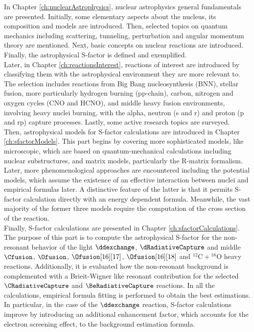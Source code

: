 \documentclass[openany]{book}
\begin{document}
In Chapter \ref{ch:nuclearAstrophysics}, nuclear astrophysics general fundamentals are presented. Initially, some elementary aspects about the nucleus, its composition and models are introduced. Then, selected topics on quantum mechanics including scattering, tunneling, perturbation and angular momentum theory are mentioned. Next, basic concepts on nuclear reactions are introduced. Finally, the astrophysical S-factor is defined and exemplified. \\

Later, in Chapter \ref{ch:reactionsInterest}, reactions of interest are introduced by classifying them with the astrophysical environment they are more relevant to. The selection includes reactions from Big Bang nucleosynthesis (BNN), stellar fusion, more particularly hydrogen burning (pp-chain), carbon, nitrogen and oxygen cycles (CNO and HCNO), and middle heavy fusion environments, involving heavy nuclei burning, with the alpha, neutron (s and r) and proton (p and rp) capture processes. Lastly, some active research topics are surveyed. \\

Then, astrophysical models for S-factor calculations are introduced in Chapter \ref{ch:sfactorModels}. This part begins by covering more sophisticated models, like microscopic, which are based on quantum-mechanical calculations including nuclear substructures, and matrix models, particularly the R-matrix formalism. Later, more phenomenological approaches are encountered including the potential models, which assume the existence of an effective interaction between nuclei and empirical formulas later. A distinctive feature of the latter is that it permits S-factor calculation directly with an energy dependent formula. Meanwhile, the vast majority of the former three models require the computation of the cross section of the reaction. \\

Finally, S-factor calculations are presented in Chapter \ref{ch:sfactorCalculations}. The purpose of this part is to compute the astrophysical S-factor for the non-resonant behavior of the light $\ddexchange$, $\dRadiativeCapture$ and middle $\Cfusion$, $\Ofusion$, $\Ofusion[16][17]$, $\Ofusion[16][18]$ and $\mathrm{{}^{12}C + {}^{16}O}$ heavy reactions. Additionally, it is evaluated how the non-resonant background is complemented with a Brieit-Wigner like resonant contribution for the selected $\CRadiativeCapture$ and $\BeRadiativeCapture$ reactions. In all the calculations, empirical formula fitting is performed to obtain the best estimations. In particular, in the case of the $\ddexchange$ reaction, S-factor calculations improve by introducing an additional enhancement factor, which accounts for the electron screening effect, to the background estimation formula.
 
\end{document}
